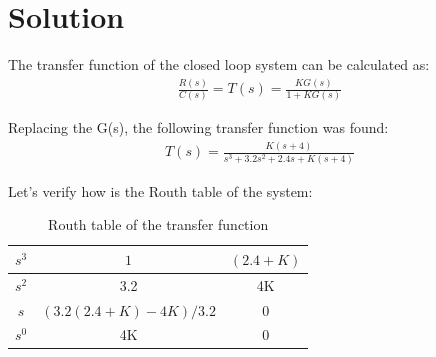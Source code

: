 \documentclass[a4paper]{article}
\begin{document}
\section*{Solution}
The transfer function of the closed loop system can be calculated as:
\begin{align*}
    \frac{R(s)}{C(s)}=T(s)=\frac{KG(s)}{1+KG(s)}
\end{align*}

Replacing the G(s), the following transfer function was found:
\begin{align*}
    T(s) = \frac{K(s+4)}{s^3+3.2s^2+2.4s+K(s+4)}
\end{align*}

Let's verify how is the Routh table of the system:
\begin{table}[H]
    \centering
    \begin{tabular}{|c|c|c|}
	\hline    
    $s^3$  & $1$ & $(2.4+K)$  \\
    \hline
    $s^2$    &  3.2 & 4K  \\
    \hline
    $s$ & $(3.2(2.4+K)-4K)/3.2$ &0 \\
    \hline
    $s^0$ & 4K &0 \\
    \hline
    \end{tabular}
    \caption{Routh table of the transfer function}
    \label{tab:EXE_2_ROUTH_TABLE_1}
\end{table}
\end{document}
